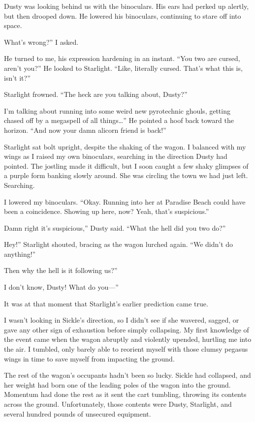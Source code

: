 Dusty was looking behind us with the binoculars. His ears had perked up alertly, but then drooped down. He lowered his binoculars, continuing to stare off into space.

\leavevmode{}What’s wrong?” I asked.

He turned to me, his expression hardening in an instant. “You two are cursed, aren’t you?” He looked to Starlight. “Like, literally cursed. That’s what this is, isn’t it?”

Starlight frowned. “The heck are you talking about, Dusty?”

\leavevmode{}I’m talking about running into some weird new pyrotechnic ghouls, getting chased off by a megaspell of all things…” He pointed a hoof back toward the horizon. “And now your damn alicorn friend is back!”

Starlight sat bolt upright, despite the shaking of the wagon. I balanced with my wings as I raised my own binoculars, searching in the direction Dusty had pointed. The jostling made it difficult, but I soon caught a few shaky glimpses of a purple form banking slowly around. She was circling the town we had just left. Searching.

I lowered my binoculars. “Okay. Running into her at Paradise Beach could have been a coincidence. Showing up here, now? Yeah, that’s suspicious.”

\leavevmode{}Damn right it’s suspicious,” Dusty said. “What the hell did you two do?”

\leavevmode{}Hey!” Starlight shouted, bracing as the wagon lurched again. “We didn’t do anything!”

\leavevmode{}Then why the hell is it following us?”

\leavevmode{}I don’t know, Dusty! What do you—”

It was at that moment that Starlight’s earlier prediction came true.

I wasn’t looking in Sickle’s direction, so I didn’t see if she wavered, sagged, or gave any other sign of exhaustion before simply collapsing. My first knowledge of the event came when the wagon abruptly and violently upended, hurtling me into the air. I tumbled, only barely able to reorient myself with those clumsy pegasus wings in time to save myself from impacting the ground.

The rest of the wagon’s occupants hadn’t been so lucky. Sickle had collapsed, and her weight had born one of the leading poles of the wagon into the ground. Momentum had done the rest as it sent the cart tumbling, throwing its contents across the ground. Unfortunately, those contents were Dusty, Starlight, and several hundred pounds of unsecured equipment.

